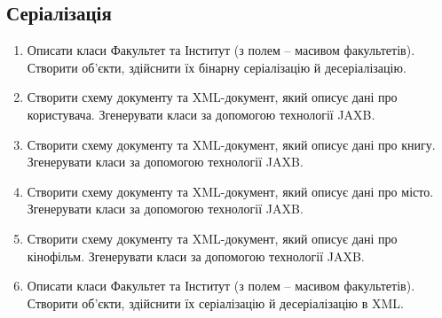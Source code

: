 \documentclass[]{article}
\begin{document}
\subsection{Серіалізація}
\begin{enumerate}
\def\labelenumi{\arabic{enumi}.}
\item   Описати класи Факультет та Інститут (з полем – масивом факультетів). Створити об'єкти, здійснити їх бінарну серіалізацію й десеріалізацію. 
\item   Створити схему документу та XML-документ, який описує дані про користувача. Згенерувати класи за допомогою технології JAXB. 
\item   Створити схему документу та XML-документ, який описує дані про книгу. Згенерувати класи за допомогою технології JAXB. 
\item   Створити схему документу та XML-документ, який описує дані про місто. Згенерувати класи за допомогою технології JAXB. 
\item   Створити схему документу та XML-документ, який описує дані про кінофільм. Згенерувати класи за допомогою технології JAXB. 
\item   Описати класи Факультет та Інститут (з полем – масивом факультетів). Створити об'єкти, здійснити їх серіалізацію й десеріалізацію в XML. 
\end{enumerate}
\end{document}
